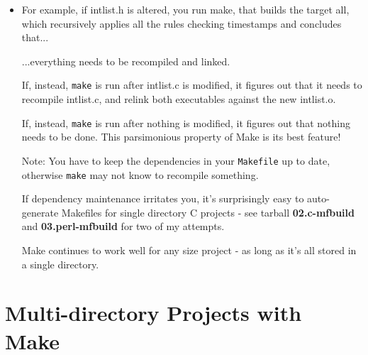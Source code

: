 \documentclass[aspectratio=169]{beamer}
\begin{document}
\begin{frame}[fragile]

\begin{itemize}
      \item
       For example, if \alert{intlist.h} is altered, you run \alert{make},
       that builds the target \alert{all}, which recursively applies all
       the rules checking timestamps and concludes that...

       \pitem
       ...everything needs to be recompiled and linked.

      \pitem
      If, instead, \verb+make+ is run after \alert{intlist.c} is modified,
      it figures out that it needs to recompile \alert{intlist.c},
      and relink both executables against the
      new \alert{intlist.o}.

      \pitem
      If, instead, \verb+make+ is run after nothing is modified,
      it figures out that nothing needs to be done.
      This \alert{parsimonious} property of Make is its best feature!

      \pitem
      Note: You have to keep the dependencies in your \verb+Makefile+
      up to date, otherwise \verb+make+ may not know to recompile something.

      \pitem
      If dependency maintenance irritates you, it's surprisingly easy to
      auto-generate Makefiles for single directory C projects - see tarball
      {\bf 02.c-mfbuild} and {\bf 03.perl-mfbuild} for two of my attempts.

      \pitem 
      Make continues to work well for any size project - as long as it's all stored
      in a single directory.



\end{itemize}

\end{frame}

\section{Multi-directory Projects with Make}
\end{document}
